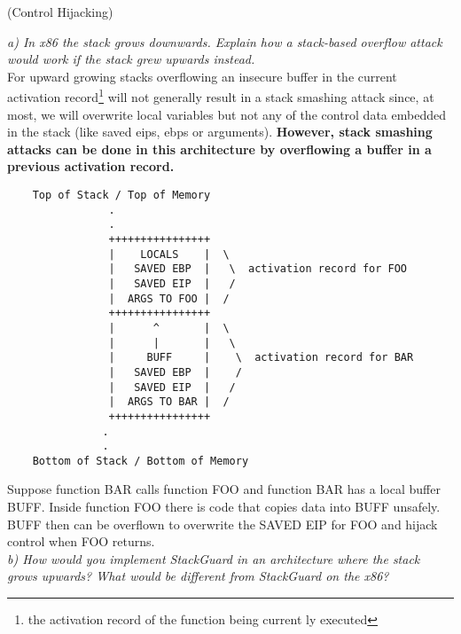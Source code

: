 \begin{prob}  (Control Hijacking)
\end{prob}

\noindent \textit{a) In x86 the stack grows downwards. Explain how a stack-based overflow attack would work if the stack grew upwards instead.}\\

\noindent For upward growing stacks overflowing an insecure buffer in the current activation record\footnote{the activation record of the function being current	ly executed} will not generally result in a stack smashing attack since, at most, we will overwrite local variables but not any of the control data embedded in the stack (like saved eips,  ebps or arguments). \textbf{However, stack smashing attacks can be done in this architecture by overflowing a buffer in a previous activation record. }
\begin{verbatim}
    Top of Stack / Top of Memory
                .
                .
        		++++++++++++++++
        		|    LOCALS    |  \
        		|   SAVED EBP  |   \  activation record for FOO
        		|   SAVED EIP  |   /
        		|  ARGS TO FOO |  /
        		++++++++++++++++
        		|      ^       |  \
        		|      |       |   \
        		|     BUFF     |    \  activation record for BAR  
        		|   SAVED EBP  |    /  
        		|   SAVED EIP  |   /
        		|  ARGS TO BAR |  /
        		++++++++++++++++
               .
               .
    Bottom of Stack / Bottom of Memory
\end{verbatim}
Suppose function BAR calls function FOO and function BAR has a local buffer BUFF. Inside function FOO there is code that copies data into BUFF unsafely. BUFF then can be overflown to overwrite the SAVED EIP for FOO and hijack control when FOO returns.\\

\noindent \textit{b) How would you implement StackGuard in an architecture where the stack grows upwards? What would be different from StackGuard on the x86?}\\

